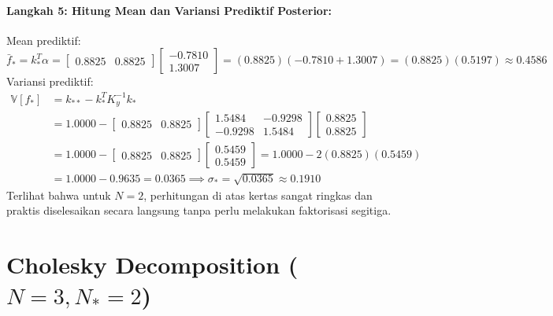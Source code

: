 \documentclass[11pt,a4paper]{article}
\def\boldsymbol#1{#1}%
\def\mathbf#1{#1}%
\begin{document}
\paragraph{Langkah 5: Hitung Mean dan Variansi Prediktif Posterior:}
Mean prediktif:
\begin{equation}
\bar{f}_* = \mathbf{k}_*^T \boldsymbol{\alpha} = \begin{bmatrix} 0.8825 & 0.8825 \end{bmatrix} \begin{bmatrix} -0.7810 \\ 1.3007 \end{bmatrix} = (0.8825)(-0.7810 + 1.3007) = (0.8825)(0.5197) \approx \mathbf{0.4586}
\end{equation}
Variansi prediktif:
\begin{align}
\mathbb{V}[f_*] &= k_{**} - \mathbf{k}_*^T K_y^{-1} \mathbf{k}_* \nonumber \\
&= 1.0000 - \begin{bmatrix} 0.8825 & 0.8825 \end{bmatrix} \begin{bmatrix} 1.5484 & -0.9298 \\ -0.9298 & 1.5484 \end{bmatrix} \begin{bmatrix} 0.8825 \\ 0.8825 \end{bmatrix} \nonumber \\
&= 1.0000 - \begin{bmatrix} 0.8825 & 0.8825 \end{bmatrix} \begin{bmatrix} 0.5459 \\ 0.5459 \end{bmatrix} = 1.0000 - 2(0.8825)(0.5459) \nonumber \\
&= 1.0000 - 0.9635 = \mathbf{0.0365} \implies \sigma_* = \sqrt{0.0365} \approx \mathbf{0.1910}
\end{align}
Terlihat bahwa untuk $N = 2$, perhitungan di atas kertas sangat ringkas dan praktis diselesaikan secara langsung tanpa perlu melakukan faktorisasi segitiga.

\section{Cholesky Decomposition (\texorpdfstring{$N = 3, N_* = 2$}{N = 3, N* = 2})}
\label{sec:contoh_n3}
\end{document}

